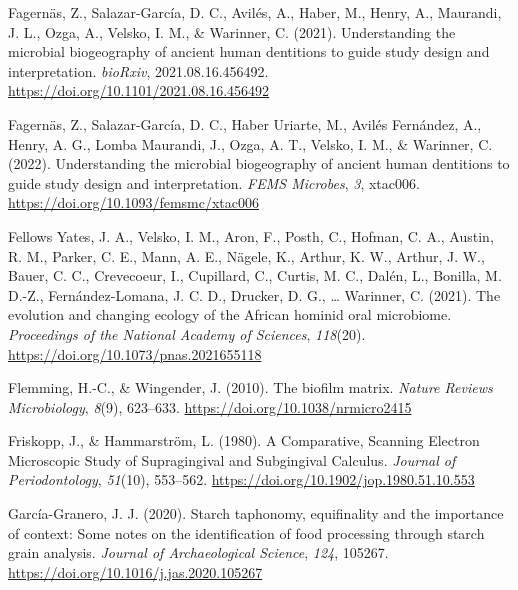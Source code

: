 \documentclass[
  b5paper,
]{book}
\newlength{\cslhangindent}
\newlength{\cslentryspacingunit} %
\newenvironment{CSLReferences}[2] %
 {%
  \setlength{\parindent}{0pt}
  \ifodd #1
  \let\oldpar\par
  \def\par{\hangindent=\cslhangindent\oldpar}
  \fi
  \setlength{\parskip}{#2\cslentryspacingunit}
 }%
 {}
\begin{document}
\begin{CSLReferences}{1}{0}
\leavevmode{}%
Fagernäs, Z., Salazar-García, D. C., Avilés, A., Haber, M., Henry, A.,
Maurandi, J. L., Ozga, A., Velsko, I. M., \& Warinner, C. (2021).
Understanding the microbial biogeography of ancient human dentitions to
guide study design and interpretation. \emph{bioRxiv},
2021.08.16.456492. \url{https://doi.org/10.1101/2021.08.16.456492}

\leavevmode{}%
Fagernäs, Z., Salazar-García, D. C., Haber Uriarte, M., Avilés
Fernández, A., Henry, A. G., Lomba Maurandi, J., Ozga, A. T., Velsko, I.
M., \& Warinner, C. (2022). Understanding the microbial biogeography of
ancient human dentitions to guide study design and interpretation.
\emph{FEMS Microbes}, \emph{3}, xtac006.
\url{https://doi.org/10.1093/femsmc/xtac006}

\leavevmode{}%
Fellows Yates, J. A., Velsko, I. M., Aron, F., Posth, C., Hofman, C. A.,
Austin, R. M., Parker, C. E., Mann, A. E., Nägele, K., Arthur, K. W.,
Arthur, J. W., Bauer, C. C., Crevecoeur, I., Cupillard, C., Curtis, M.
C., Dalén, L., Bonilla, M. D.-Z., Fernández-Lomana, J. C. D., Drucker,
D. G., \ldots{} Warinner, C. (2021). The evolution and changing ecology
of the {African} hominid oral microbiome. \emph{Proceedings of the
National Academy of Sciences}, \emph{118}(20).
\url{https://doi.org/10.1073/pnas.2021655118}

\leavevmode{}%
Flemming, H.-C., \& Wingender, J. (2010). The biofilm matrix.
\emph{Nature Reviews Microbiology}, \emph{8}(9), 623--633.
\url{https://doi.org/10.1038/nrmicro2415}

\leavevmode{}%
Friskopp, J., \& Hammarström, L. (1980). A {Comparative}, {Scanning
Electron Microscopic Study} of {Supragingival} and {Subgingival
Calculus}. \emph{Journal of Periodontology}, \emph{51}(10), 553--562.
\url{https://doi.org/10.1902/jop.1980.51.10.553}

\leavevmode{}%
García-Granero, J. J. (2020). Starch taphonomy, equifinality and the
importance of context: {Some} notes on the identification of food
processing through starch grain analysis. \emph{Journal of
Archaeological Science}, \emph{124}, 105267.
\url{https://doi.org/10.1016/j.jas.2020.105267}


\end{CSLReferences}
\end{document}

